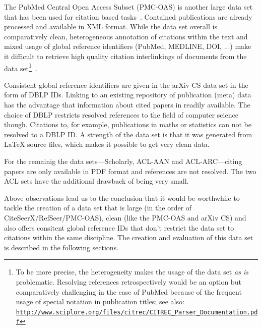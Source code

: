The PubMed Central Open Access Subset (PMC-OAS) is another large data set that has been used for citation based tasks~\cite{Duma2016,Gipp2015,Galke2018,Bhagavatula2018}. Contained publications are already processed and available in XML format. While the data set overall is comparatively clean, heterogeneous annotation of citations within the text and mixed usage of global reference identifiers (PubMed, MEDLINE, DOI, ...) make it difficult to retrieve high quality citation interlinkings of documents from the data set\footnote{To be more precise, the heterogeneity makes the usage of the data set \emph{as is} problematic. Resolving references retrospectively would be an option but comparatively challenging in the case of PubMed because of the frequent usage of special notation in publication titles; see also: \texttt{\url{http://www.sciplore.org/files/citrec/CITREC_Parser_Documentation.pdf}}}~\cite{Gipp2015}.

Consistent global reference identifiers are given in the arXiv CS data set in the form of DBLP IDs. Linking to an existing repository of publication (meta) data has the advantage that information about cited papers in readily available. The choice of DBLP restricts resolved references to the field of computer science though. Citations to, for example, publications in maths or statistics can not be resolved to a DBLP ID. A strength of the data set is that it was generated from \LaTeX{} source files, which makes it possible to get very clean data.

For the remainig the data sets---Scholarly, ACL-AAN and ACL-ARC---citing papers are only available in PDF format and references are not resolved. The two ACL sets have the additional drawback of being very small.

Above observations lead us to the conclusion that it would be worthwhile to tackle the creation of a data set that is large (in the order of CiteSeerX/RefSeer/PMC-OAS), clean (like the PMC-OAS and arXiv CS) and also offers consitent global reference IDs that don't restrict the data set to citations within the same discipline. The creation and evaluation of this data set is described in the following sections.



